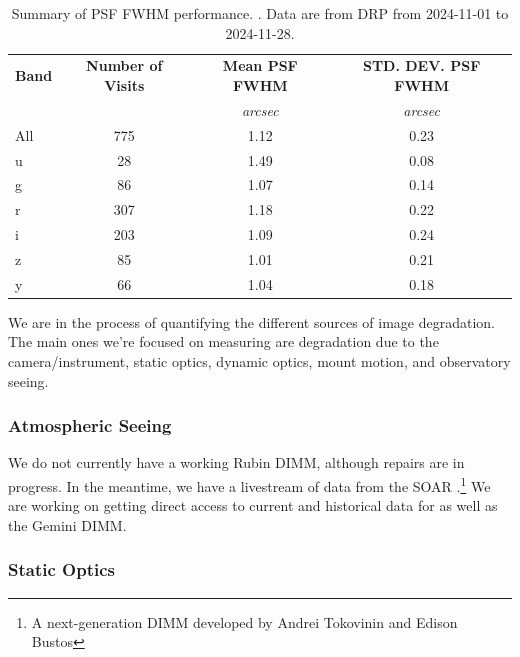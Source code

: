 \begin{table}
\centering
\begin{tabular}{@{}lccc@{}}
\textbf{Band} & \textbf{Number of Visits} & \textbf{Mean PSF FWHM} & \textbf{STD. DEV. PSF FWHM} \\
 & & \textit{arcsec} & \textit{arcsec} \\
  \hline
All           & 775                      & 1.12                   & 0.23                  \\
u             & 28                       & 1.49                   & 0.08                  \\
g             & 86                       & 1.07                   & 0.14                  \\
r             & 307                      & 1.18                   & 0.22                  \\
i             & 203                      & 1.09                   & 0.24                  \\
z             & 85                       & 1.01                   & 0.21                  \\
y             & 66                       & 1.04                   & 0.18                  \\ 
\end{tabular}
\caption{Summary of PSF FWHM performance. . Data are from DRP from 2024-11-01 to 2024-11-28.}
\label{tab:psf_summary}
\end{table}



We are in the process of quantifying the different sources of image degradation. The main ones we're focused on measuring are degradation due to the camera/instrument, static optics, dynamic optics, mount motion, and observatory seeing.

\subsubsection{Atmospheric Seeing}

We do not currently have a working Rubin DIMM, although repairs are in progress. In the meantime, we have a livestream of data from the SOAR \RINGSS.\footnote{A  next-generation DIMM developed by Andrei Tokovinin and Edison Bustos} We are working on getting direct access to current and historical data for \RINGSS as well as the Gemini DIMM.

\subsubsection{Static Optics}

